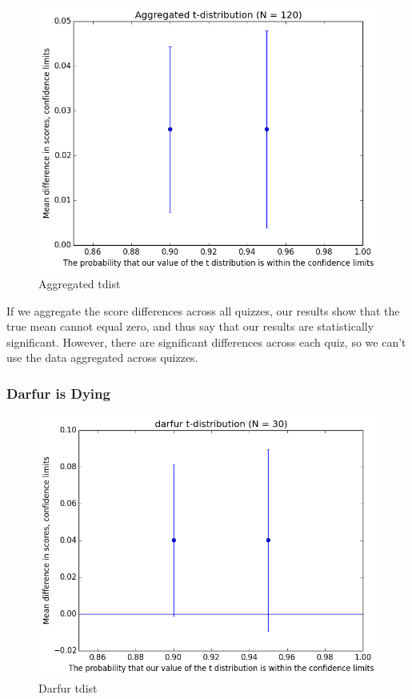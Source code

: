 				\begin{figure}[] 
					\centering 
					\includegraphics[width=\textwidth, height=.4\textheight, keepaspectratio=true]{aggregated_tdist.png} 
					\caption{Aggregated tdist}
				\end{figure}

				If we aggregate the score differences across all quizzes, our results show that the true mean cannot equal zero, and thus say that our results are statistically significant. However, there are significant differences across each quiz, so we can't use the data aggregated across quizzes.

			\subsubsection{Darfur is Dying}

				\begin{figure}[] 
					\centering 
					\includegraphics[width=\textwidth, height=.4\textheight, keepaspectratio=true]{darfur_tdist.png} 
					\caption{Darfur tdist}
				\end{figure}

